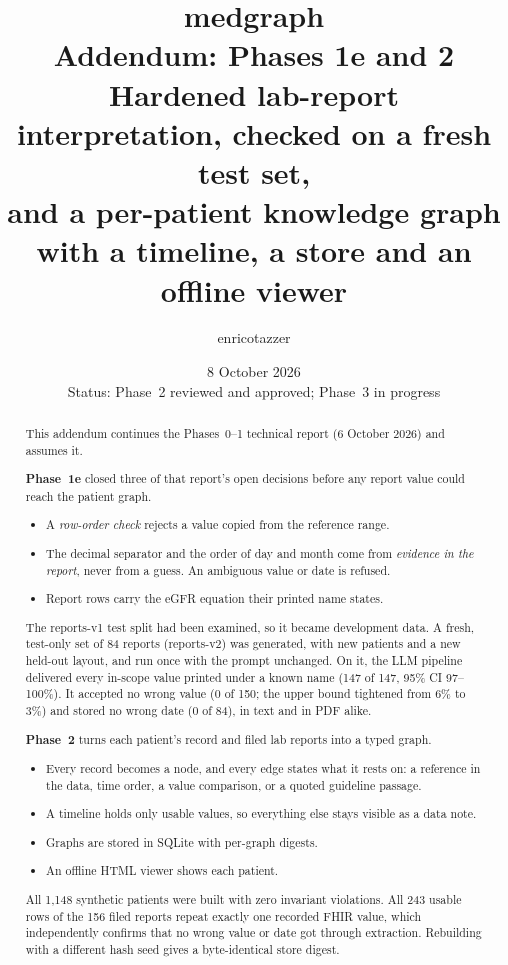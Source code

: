 \documentclass[11pt,a4paper]{article}
\title{\textbf{medgraph}\\[6pt]
  \Large Addendum: Phases 1e and 2\\[4pt]
  \normalsize Hardened lab-report interpretation, checked on a fresh test set,\\
  and a per-patient knowledge graph with a timeline, a store and an offline viewer}
\author{enricotazzer}
\date{8 October 2026\\[2pt]\small Status: Phase~2 reviewed and approved; Phase~3 in progress}
\begin{document}
\maketitle

\begin{abstract}
\noindent This addendum continues the Phases~0--1 technical report (6 October 2026) and assumes it.

\textbf{Phase~1e} closed three of that report's open decisions before any report value could reach the patient graph.
\begin{itemize}[nosep]
  \item A \emph{row-order check} rejects a value copied from the reference range.
  \item The decimal separator and the order of day and month come from \emph{evidence in the report}, never from a guess. An ambiguous value or date is refused.
  \item Report rows carry the eGFR equation their printed name states.
\end{itemize}
The reports-v1 test split had been examined, so it became development data. A fresh, test-only set of 84 reports (reports-v2) was generated, with new patients and a new held-out layout, and run once with the prompt unchanged. On it, the LLM pipeline delivered every in-scope value printed under a known name (147 of 147, 95\% CI 97--100\%). It accepted no wrong value (0 of 150; the upper bound tightened from 6\% to 3\%) and stored no wrong date (0 of 84), in text and in PDF alike.

\textbf{Phase~2} turns each patient's record and filed lab reports into a typed graph.
\begin{itemize}[nosep]
  \item Every record becomes a node, and every edge states what it rests on: a reference in the data, time order, a value comparison, or a quoted guideline passage.
  \item A timeline holds only usable values, so everything else stays visible as a data note.
  \item Graphs are stored in SQLite with per-graph digests.
  \item An offline HTML viewer shows each patient.
\end{itemize}
All 1,148 synthetic patients were built with zero invariant violations. All 243 usable rows of the 156 filed reports repeat exactly one recorded FHIR value, which independently confirms that no wrong value or date got through extraction. Rebuilding with a different hash seed gives a byte-identical store digest.
\end{abstract}
\end{document}
